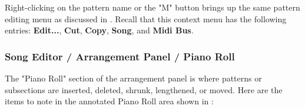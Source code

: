    Right-clicking on the pattern name or the "M" button brings up the same
   pattern editing menu as discussed in
   .
   Recall that this context menu has the following entries:
   \textbf{Edit...}, \textbf{Cut}, \textbf{Copy},
   \textbf{Song}, and \textbf{Midi Bus}.

\subsubsection{Song Editor / Arrangement Panel / Piano Roll}
\label{subsubsec:seq64_song_editor_arrangement_panel_roll}

   The "Piano Roll" section of the arrangement panel is where patterns or
   subsections are inserted, deleted, shrunk, lengthened, or moved.
   Here are the items to note in the annotated Piano Roll area
   shown in :

